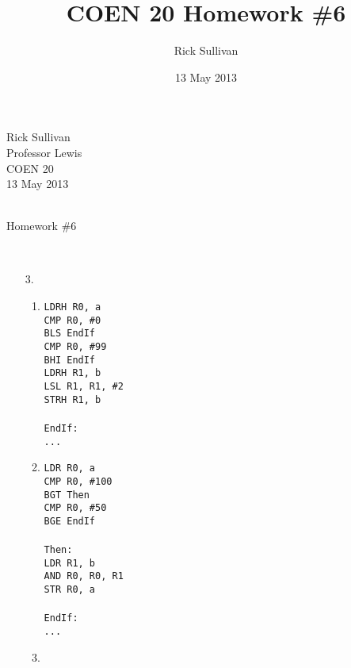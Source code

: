 \documentclass{article}
\title{COEN 20 Homework \#6}
\date{13 May 2013}
\author{Rick Sullivan}
\begin{document}
\noindent Rick Sullivan     \\
          Professor Lewis   \\
          COEN 20           \\
          13 May 2013        \\
                            \\
\centerline {Homework \#6}    \\

\begin{enumerate}
    \item[3.]
        \begin{multicols}{2}
        \begin{enumerate}
            \item
                \texttt{LDRH R0, a   \\
                CMP R0, \#0 \\
                BLS EndIf   \\
                CMP R0, \#99\\
                BHI EndIf   \\
                LDRH R1, b  \\
                LSL R1, R1, \#2 \\
                STRH R1, b  \\
                            \\
                EndIf:      \\
                ...  \\
                }
            \item
                \texttt{LDR R0, a   \\
                CMP R0, \#100   \\
                BGT Then    \\
                CMP R0, \#50\\
                BGE EndIf   \\
                            \\
                Then:       \\
                LDR R1, b   \\
                AND R0, R0, R1  \\
                STR R0, a   \\
                            \\
                EndIf:      \\
                ...  \\
                }
            \item

\end{enumerate}
\end{multicols}
\end{enumerate}
\end{document}

